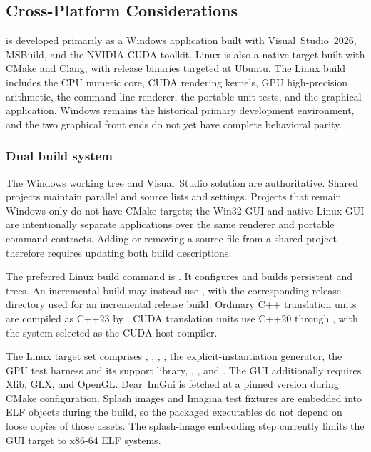 \subsection{Cross-Platform Considerations}
\label{sec:cross-platform}

\FractalShark{} is developed primarily as a Windows application built with
Visual~Studio~2026, MSBuild, and the NVIDIA CUDA toolkit. Linux is also a native
target built with CMake and Clang, with release binaries targeted at Ubuntu.
The Linux build includes the CPU numeric core, CUDA rendering kernels, GPU
high-precision arithmetic, the command-line renderer, the portable unit tests,
and the  graphical application. Windows remains the
historical primary development environment, and the two graphical front ends
do not yet have complete behavioral parity.

\subsubsection{Dual build system}
\label{subsec:dual-build}

The Windows working tree and Visual~Studio solution are authoritative. Shared
projects maintain parallel  and  source
lists and settings. Projects that remain Windows-only do not have CMake targets;
the Win32 GUI and native Linux GUI are intentionally separate applications over
the same renderer and portable command contracts. Adding or removing a source
file from a shared project therefore requires updating both build descriptions.

The preferred Linux build command is . It configures
and builds persistent  and  trees. An
incremental build may instead use , with the corresponding release directory used for an
incremental release build. Ordinary C++ translation units are compiled as
C++23 by . CUDA translation units use C++20 through
, with the system  selected as the CUDA host compiler.

The Linux target set comprises ,
, ,
, the explicit-instantiation generator, the GPU test
harness and its support library, ,
, and . The GUI additionally
requires Xlib, GLX, and OpenGL. Dear~ImGui is fetched at a pinned version during
CMake configuration. Splash images and Imagina test fixtures are embedded into
ELF objects during the build, so the packaged executables do not depend on
loose copies of those assets. The splash-image embedding step currently limits
the GUI target to x86-64 ELF systems.

